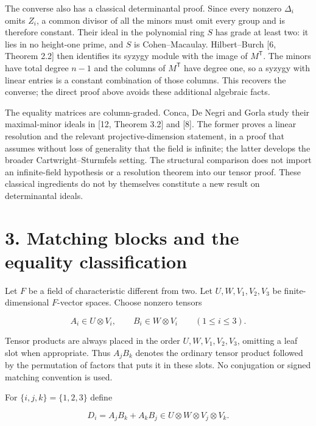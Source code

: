 \documentclass[11pt]{article}
\begin{document}
The converse also has a classical determinantal proof. Since every nonzero $\Delta_i$ omits $Z_i$, a common divisor of all the minors must omit every group and is therefore constant. Their ideal in the polynomial ring $S$ has grade at least two: it lies in no height-one prime, and $S$ is Cohen--Macaulay. Hilbert--Burch [6, Theorem 2.2] then identifies its syzygy module with the image of $M^{\mathsf T}$. The minors have total degree $n-1$ and the columns of $M^{\mathsf T}$ have degree one, so a syzygy with linear entries is a constant combination of those columns. This recovers the converse; the direct proof above avoids these additional algebraic facts.


The equality matrices are column-graded. Conca, De Negri and Gorla study their maximal-minor ideals in [12, Theorem 3.2] and [8]. The former proves a linear resolution and the relevant projective-dimension statement, in a proof that assumes without loss of generality that the field is infinite; the latter develops the broader Cartwright--Sturmfels setting. The structural comparison does not import an infinite-field hypothesis or a resolution theorem into our tensor proof. These classical ingredients do not by themselves constitute a new result on determinantal ideals.


\section*{3. Matching blocks and the equality classification}

Let $F$ be a field of characteristic different from two. Let $U,W,V_1,V_2,V_3$ be finite-dimensional $F$-vector spaces. Choose nonzero tensors


\nopagebreak[4]

\begin{equation}
A_i\in U\otimes V_i,\qquad B_i\in W\otimes V_i\qquad(1\leq i\leq3).
\tag{11}
\end{equation}

Tensor products are always placed in the order $U,W,V_1,V_2,V_3$, omitting a leaf slot when appropriate. Thus $A_jB_k$ denotes the ordinary tensor product followed by the permutation of factors that puts it in these slots. No conjugation or signed matching convention is used.


For $\{i,j,k\}=\{1,2,3\}$ define


\nopagebreak[4]

\begin{equation}
D_i=A_jB_k+A_kB_j\in U\otimes W\otimes V_j\otimes V_k.
\tag{12}
\end{equation}
\end{document}
